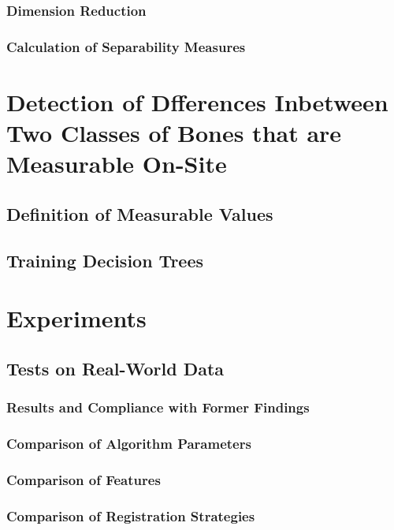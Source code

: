 \documentclass[pdftex,12pt,a4paper]{report}
\begin{document}
\subsection{Dimension Reduction}

\subsection{Calculation of Separability Measures}

\chapter{Detection of Dfferences Inbetween Two Classes of Bones that are Measurable On-Site}

\section{Definition of Measurable Values}

\section{Training Decision Trees}

\chapter{Experiments}

\section{Tests on Real-World Data}

\subsection{Results and Compliance with Former Findings}

\subsection{Comparison of Algorithm Parameters}

\subsection{Comparison of Features}

\subsection{Comparison of Registration Strategies}
\end{document}
